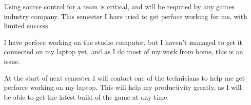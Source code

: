 \documentclass{scrartcl}
\begin{document}
Using source control for a team is critical, and will be required by any games industry company.
This semester I have tried to get perfoce working for me, with limited success.

I have perfoce working on the studio computer, but I haven't managed to get it connected on my laptop yet, and as I do most of my work from home, this is an issue.


At the start of next semester I will contact one of the technicians to help me get perforce working on my laptop. This will help my productivity greatly, as I will be able to get the latest build of the game at any time.

\par






%
\end{document}

